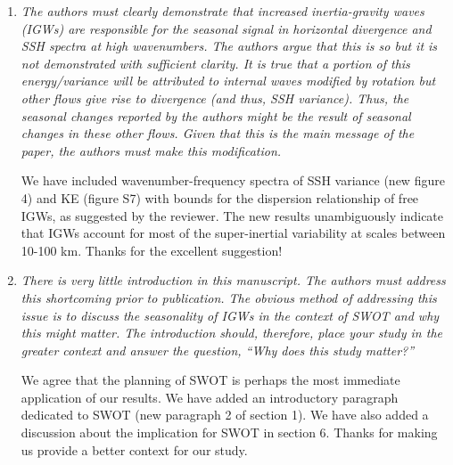 \documentclass[11pt]{article}
\newcommand{\bdp}{\begin{description}}
\newcommand{\edp}{\end{description}}
\begin{document}
\begin{enumerate}

  \item {\it The authors must clearly demonstrate that increased inertia-gravity waves (IGWs) are
        responsible for the seasonal signal in horizontal divergence and SSH spectra at high
        wavenumbers. The authors argue that this is so but it is not demonstrated with sufficient
        clarity. It is true that a portion of this energy/variance will be attributed to internal waves
        modified by rotation but other flows give rise to divergence (and thus, SSH variance). Thus,
        the seasonal changes reported by the authors might be the result of seasonal changes in these
        other flows. Given that this is the main message of the paper, the authors must make this
        modification.}\\

        \bdp
            We have included wavenumber-frequency
            spectra of SSH variance (new figure 4) and KE (figure S7) with bounds for the
            dispersion relationship of free IGWs, as suggested by the reviewer. The new
            results unambiguously
            indicate that IGWs account for most of the super-inertial variability at
            scales between 10-100 km. Thanks for the excellent suggestion!
        \edp

  \item {\it There is very little introduction in this manuscript. The authors must address this
          shortcoming prior to publication. The obvious method of addressing this issue is to discuss
          the seasonality of IGWs in the context of SWOT and why this might matter. The introduction
          should, therefore, place your study in the greater context and answer the question,
          ``Why does this study matter?''}\\

          \bdp
              We agree that the planning of SWOT is perhaps the most immediate
              application of our results. We have added an introductory paragraph dedicated to SWOT (new
              paragraph 2 of section 1). We have also added a discussion about the
              implication for SWOT in section 6. Thanks for making us provide a better
              context for our study.
          \edp


\end{enumerate}
\end{document}
